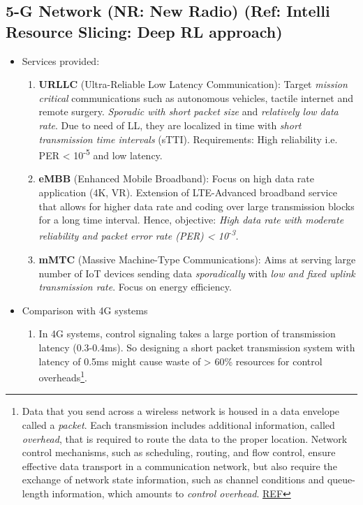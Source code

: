 \documentclass[11pt]{article}
\begin{document}
\subsection{5-G Network (NR: New Radio) (Ref: Intelli Resource Slicing: Deep RL approach)}
\label{sec:orgfebdc01}
\begin{itemize}
\item Services provided:
\begin{enumerate}
\item \textbf{URLLC} (Ultra-Reliable Low Latency Communication): Target \emph{mission critical} communications such as autonomous vehicles, tactile internet and remote surgery. \emph{Sporadic with short packet size} and \emph{relatively low data rate}. Due to need of LL, they are localized in time with \emph{short transmission time intervals} (sTTI). Requirements: High reliability i.e. PER < 10\textsuperscript{-5} and low latency.
\item \textbf{eMBB} (Enhanced Mobile Broadband): Focus on high data rate application (4K, VR). Extension of LTE-Advanced broadband service that allows for higher data rate and coding over large transmission blocks for a long time interval. Hence, objective: \emph{High data rate with moderate reliability and packet error rate (PER) < 10\textsuperscript{-3}.}
\item \textbf{mMTC} (Massive Machine-Type Communications): Aims at serving large number of IoT devices sending data \emph{sporadically} with \emph{low and fixed uplink transmission rate}. Focus on energy efficiency.
\end{enumerate}
\item Comparison with 4G systems
\begin{enumerate}
\item In 4G systems, control signaling takes a large portion of transmission latency (0.3-0.4ms). So designing a short packet transmission system with latency of 0.5ms might cause waste of > 60\% resources for control overheads\footnote{Data that you send across a wireless network is housed in a data envelope called a \emph{packet}. Each transmission includes additional information, called \emph{overhead}, that is required to route the data to the proper location. Network control mechanisms, such as scheduling, routing, and flow control, ensure effective data transport in a communication network, but also require the exchange of network state information, such as channel conditions and queue-length information, which amounts to \emph{control overhead}. \href{http://cnrg.mit.edu/protocol-information}{REF}}.

\end{enumerate}
\end{itemize}
\end{document}
